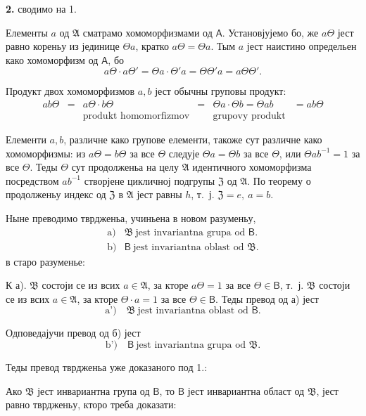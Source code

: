 \documentclass[11pt]{article}
\begin{document}
\textbf{2.} сводимо на 1.

Елементы \(a\) од \(\mathfrak A\) сматрамо хомоморфизмами од \(\mathsf A\). Установјујемо бо, же \(a\Theta\) јест равно кореньу из јединице \(\Theta a\), кратко \(a\Theta=\Theta a\). Тым \(a\) јест наистино определьен како хомоморфизм од \(\mathsf A\), бо
\[
a\Theta\cdot a\Theta'=\Theta a\cdot\Theta' a=\Theta\Theta' a=a\Theta\Theta'.
\]

Продукт двох хомоморфизмов \(a,b\) јест обычны груповы продукт:
\[
\begin{array}{cccccc}
ab\Theta&=&a\Theta\cdot b\Theta&=&\Theta a\cdot\Theta b=\Theta ab&=ab\Theta\\
&&\text{produkt homomorfizmov}&&\text{grupovy produkt}&
\end{array}
\]

Елементи \(a,b\), различне како групове елементи, такоже сут различне како хомоморфизмы: из \(a\Theta=b\Theta\) за все \(\Theta\) следује \(\Theta a=\Theta b\) за все \(\Theta\), или \(\Theta ab^{-1}=1\) за все \(\Theta\). Теды \(\Theta\) сут продолженьа на целу \(\mathfrak A\) идентичного хомоморфизма посредством \(ab^{-1}\) створјене цикличној подгрупы \(\mathfrak Z\) од \(\mathfrak A\). По теорему о продолженьу индекс од \(\mathfrak Z\) в \(\mathfrak A\) јест равны \(h\), т.~ј. \(\mathfrak Z=e,\ a=b\).

Ныне преводимо тврдженьа, учиньена в новом разуменьу,
\[
\begin{array}{ll}
\text{a)}& \mathfrak B\ \text{jest invariantna grupa od }\mathsf B.\\
\text{b)}& \mathsf B\ \text{jest invariantna oblast od }\mathfrak B.
\end{array}
\]
в старо разуменье:

К а). \(\mathfrak B\) состоји се из всих \(a\in\mathfrak A\), за кторе \(a\Theta=1\) за все \(\Theta\in\mathsf B\), т.~ј. \(\mathfrak B\) состоји се из всих \(a\in\mathfrak A\), за кторе \(\Theta\cdot a=1\) за все \(\Theta\in\mathsf B\). Теды превод од а) јест
\[
\text{a')} \quad \mathfrak B\ \text{jest invariantna oblast od }\mathsf B.
\]

Одповедајучи превод од б) јест
\[
\text{b')} \quad \mathsf B\ \text{jest invariantna grupa od }\mathfrak B.
\]

Теды превод тврдженьа уже доказаного под 1.:

Ако \(\mathfrak B\) јест инвариантна група од \(\mathsf B\), то \(\mathsf B\) јест инвариантна област од \(\mathfrak B\),
јест равно тврдженьу, кторо треба доказати:
\end{document}
